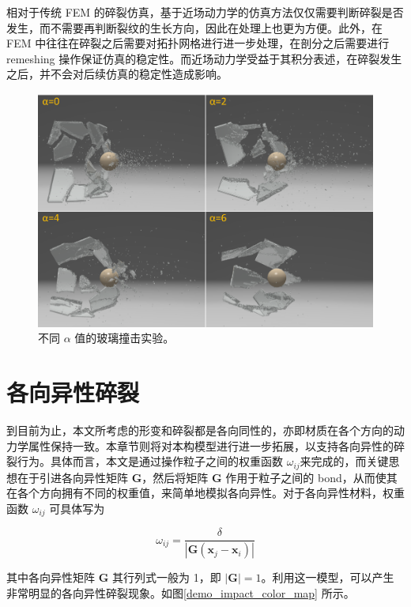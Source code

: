 相对于传统 FEM 的碎裂仿真，基于近场动力学的仿真方法仅仅需要判断碎裂是否发生，而不需要再判断裂纹的生长方向，因此在处理上也更为方便。此外，在 FEM 中往往在碎裂之后需要对拓扑网格进行进一步处理，在剖分之后需要进行 remeshing 操作保证仿真的稳定性。而近场动力学受益于其积分表述，在碎裂发生之后，并不会对后续仿真的稳定性造成影响。

\begin{figure}[!htb]
  \centering
  \captionsetup{justification=centering}
  \includegraphics[width=0.6\linewidth]{chap/image/demo_shatter_control}

  \caption{\label{demo_shatter_control}
           不同 $\alpha$ 值的玻璃撞击实验。
          }
\end{figure}

\section{各向异性碎裂}
到目前为止，本文所考虑的形变和碎裂都是各向同性的，亦即材质在各个方向的动力学属性保持一致。本章节则将对本构模型进行进一步拓展，以支持各向异性的碎裂行为。具体而言，本文是通过操作粒子之间的权重函数 $\omega_{ij}$来完成的，而关键思想在于引进各向异性矩阵 $\mathbf{G}$，然后将矩阵 $\mathbf{G}$ 作用于粒子之间的 bond，从而使其在各个方向拥有不同的权重值，来简单地模拟各向异性。对于各向异性材料，权重函数 $\omega_{ij}$ 可具体写为

\begin{equation}
\omega_{ij}=\frac{\delta}{|\mathbf{G}(\mathbf{x}_j-\mathbf{x}_i)|}
\end{equation}

其中各向异性矩阵 $\mathbf{G}$ 其行列式一般为 1，即 $|\mathbf{G}| = 1$。利用这一模型，可以产生非常明显的各向异性碎裂现象。如图\ref{demo_impact_color_map} 所示。

